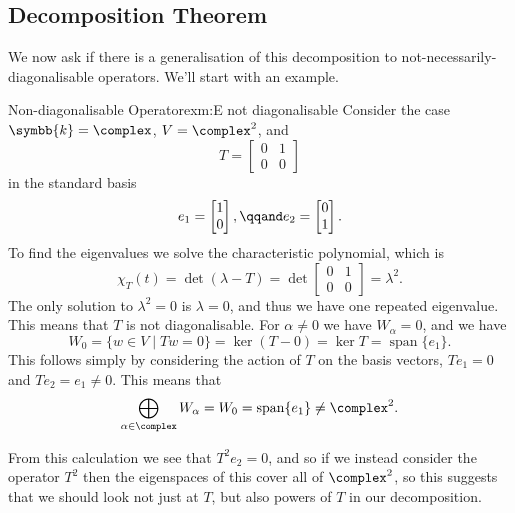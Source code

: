 \documentclass[fleqn]{NotesClass}
\renewcommand{\field}{\symbb{k}}
\DeclareMathOperator{\Span}{span}
\begin{document}
    \subsection{Decomposition Theorem}
    We now ask if there is a generalisation of this decomposition to not-necessarily-diagonalisable operators.
    We'll start with an example.
    
    \begin{exm}{Non-diagonalisable Operator}{exm:E not diagonalisable}
        Consider the case \(\field = \complex\), \(V = \complex^2\), and
        \begin{equation}
            T = 
            \begin{bmatrix}
                0 & 1\\
                0 & 0
            \end{bmatrix}
        \end{equation}
        in the standard basis
        \begin{equation}
            e_1 = 
            \begin{bmatrix}
                1\\ 0
            \end{bmatrix},
            \qqand e_2 = 
            \begin{bmatrix}
                0\\ 1
            \end{bmatrix}
            .
        \end{equation}
        To find the eigenvalues we solve the characteristic polynomial, which is
        \begin{equation}
            \chi_T(t) = \det(\lambda - T) = \det
            \begin{bmatrix}
                0 & 1\\
                0 & 0
            \end{bmatrix}
            = \lambda^2.
        \end{equation}
        The only solution to \(\lambda^2 = 0\) is \(\lambda = 0\), and thus we have one repeated eigenvalue.
        This means that \(T\) is not diagonalisable.
        For \(\alpha \ne 0\) we have \(W_\alpha = 0\), and we have
        \begin{equation}
            W_0 = \{w \in V \mid Tw = 0\} = \ker(T - 0) = \ker T = \Span\{e_1\}.
        \end{equation}
        This follows simply by considering the action of \(T\) on the basis vectors, \(Te_1 = 0\) and \(Te_2 = e_1 \ne 0\).
        This means that
        \begin{equation}
            \bigoplus_{\alpha \in \complex} W_{\alpha} = W_0 = \Span\{e_1\} \ne \complex^2.
        \end{equation}
        
        From this calculation we see that \(T^2e_2 = 0\), and so if we instead consider the operator \(T^2\) then the eigenspaces of this cover all of \(\complex^2\), so this suggests that we should look not just at \(T\), but also powers of \(T\) in our decomposition.
    \end{exm}
    
\end{document}
